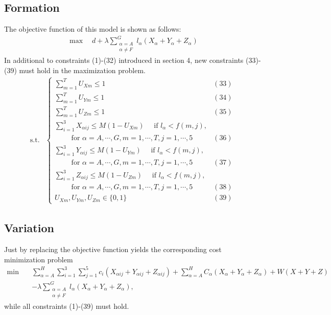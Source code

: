 \documentclass{mcmthesis}
\begin{document}
\subsection{Formation}
The objective function of this model is shown as follows:
\[
\begin{aligned}
\max\quad d+\lambda\sum_{\substack{\alpha=A\\ \alpha\ne F}}^{G}l_\alpha (X_\alpha+Y_\alpha+Z_\alpha)
\end{aligned}
\]
In additional to constraints (1)-(32) introduced in section 4, new constraints (33)-(39) must hold in the maximization problem. 
\[
\begin{aligned}
\text{s.t.}&
\left\{
\begin{array}{lr}
\sum\limits_{m=1}^{T}U_{Xm}\le1&(33)\\
\sum\limits_{m=1}^{T}U_{Ym}\le1&(34)\\
\sum\limits_{m=1}^{T}U_{Zm}\le1&(35)\\
\sum\limits_{i=1}^3X_{\alpha ij}\le M(1-U_{Xm})\quad\text{ if }l_{\alpha}< f(m,j) ,\\\qquad\text{ for }\alpha=A,\cdots,G,m=1,\cdots,T,j=1,\cdots,5&(36)\\
\sum\limits_{i=1}^3Y_{\alpha ij}\le M(1-U_{Ym})\quad\text{ if }l_{\alpha}< f(m,j)  ,\\\qquad\text{ for }\alpha=A,\cdots,G,m=1,\cdots,T,j=1,\cdots,5&(37)\\
\sum\limits_{i=1}^3Z_{\alpha ij}\le M(1-U_{Zm})\quad\text{ if }l_{\alpha}< f(m,j)  ,\\\qquad\text{ for }\alpha=A,\cdots,G,m=1,\cdots,T,j=1,\cdots,5&(38)\\
U_{Xm},U_{Ym},U_{Zm} \in \{0,1\}&(39)
\end{array}
\right.
\end{aligned}
\]

\subsection{Variation}
Just by replacing the objective function yields the corresponding cost minimization problem
\[
\begin{aligned}
\min\quad&\sum_{\alpha=A}^{H}\sum_{i=1}^{3}\sum_{j=1}^{5}c_{i}\left(X_{\alpha ij}+Y_{\alpha ij}+Z_{\alpha ij}\right)
+\sum_{\alpha=A}^{H}C_{{\alpha}}\left(X_{\alpha}+Y_{\alpha }+Z_{\alpha }\right)+W(X+Y+Z)\\
&-\lambda\sum_{\substack{\alpha=A\\ \alpha\ne F}}^{G}l_\alpha (X_\alpha+Y_\alpha+Z_\alpha),
\end{aligned}
\]
while all constraints (1)-(39) must hold.
\end{document}
